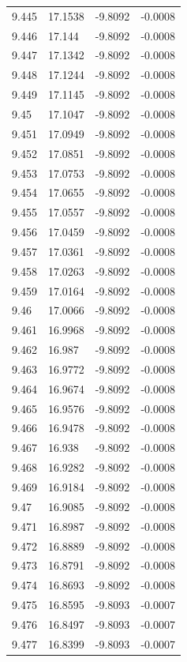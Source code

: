 \begin{tabular}{llll}
9.445 & 17.1538 & -9.8092 & -0.0008 \\
9.446 & 17.144 & -9.8092 & -0.0008 \\
9.447 & 17.1342 & -9.8092 & -0.0008 \\
9.448 & 17.1244 & -9.8092 & -0.0008 \\
9.449 & 17.1145 & -9.8092 & -0.0008 \\
9.45 & 17.1047 & -9.8092 & -0.0008 \\
9.451 & 17.0949 & -9.8092 & -0.0008 \\
9.452 & 17.0851 & -9.8092 & -0.0008 \\
9.453 & 17.0753 & -9.8092 & -0.0008 \\
9.454 & 17.0655 & -9.8092 & -0.0008 \\
9.455 & 17.0557 & -9.8092 & -0.0008 \\
9.456 & 17.0459 & -9.8092 & -0.0008 \\
9.457 & 17.0361 & -9.8092 & -0.0008 \\
9.458 & 17.0263 & -9.8092 & -0.0008 \\
9.459 & 17.0164 & -9.8092 & -0.0008 \\
9.46 & 17.0066 & -9.8092 & -0.0008 \\
9.461 & 16.9968 & -9.8092 & -0.0008 \\
9.462 & 16.987 & -9.8092 & -0.0008 \\
9.463 & 16.9772 & -9.8092 & -0.0008 \\
9.464 & 16.9674 & -9.8092 & -0.0008 \\
9.465 & 16.9576 & -9.8092 & -0.0008 \\
9.466 & 16.9478 & -9.8092 & -0.0008 \\
9.467 & 16.938 & -9.8092 & -0.0008 \\
9.468 & 16.9282 & -9.8092 & -0.0008 \\
9.469 & 16.9184 & -9.8092 & -0.0008 \\
9.47 & 16.9085 & -9.8092 & -0.0008 \\
9.471 & 16.8987 & -9.8092 & -0.0008 \\
9.472 & 16.8889 & -9.8092 & -0.0008 \\
9.473 & 16.8791 & -9.8092 & -0.0008 \\
9.474 & 16.8693 & -9.8092 & -0.0008 \\
9.475 & 16.8595 & -9.8093 & -0.0007 \\
9.476 & 16.8497 & -9.8093 & -0.0007 \\
9.477 & 16.8399 & -9.8093 & -0.0007 \\

\end{tabular}
